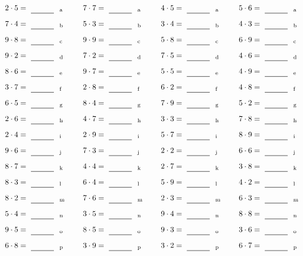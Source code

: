 \documentclass
[
  draft    = true,
  fontsize = 11pt,
  parskip  = half-
]
{scrartcl}
\begin{document}
\par\vfill\par
\begin{align*}
    \pline{2\cdot5}&=\rline{a}
  & \pline{7\cdot7}&=\rline{a}
  & \pline{4\cdot5}&=\rline{a}
  & \pline{5\cdot6}&=\rline{a} \\[1ex]
    \pline{7\cdot4}&=\rline{b}
  & \pline{5\cdot3}&=\rline{b}
  & \pline{3\cdot4}&=\rline{b}
  & \pline{4\cdot3}&=\rline{b} \\[1ex]
    \pline{9\cdot8}&=\rline{c}
  & \pline{9\cdot9}&=\rline{c}
  & \pline{5\cdot8}&=\rline{c}
  & \pline{6\cdot9}&=\rline{c} \\[1ex]
    \pline{9\cdot2}&=\rline{d}
  & \pline{7\cdot2}&=\rline{d}
  & \pline{7\cdot5}&=\rline{d}
  & \pline{4\cdot6}&=\rline{d} \\[1ex]
    \pline{8\cdot6}&=\rline{e}
  & \pline{9\cdot7}&=\rline{e}
  & \pline{5\cdot5}&=\rline{e}
  & \pline{4\cdot9}&=\rline{e} \\[1ex]
    \pline{3\cdot7}&=\rline{f}
  & \pline{2\cdot8}&=\rline{f}
  & \pline{6\cdot2}&=\rline{f}
  & \pline{4\cdot8}&=\rline{f} \\[1ex]
    \pline{6\cdot5}&=\rline{g}
  & \pline{8\cdot4}&=\rline{g}
  & \pline{7\cdot9}&=\rline{g}
  & \pline{5\cdot2}&=\rline{g} \\[1ex]
    \pline{2\cdot6}&=\rline{h}
  & \pline{4\cdot7}&=\rline{h}
  & \pline{3\cdot3}&=\rline{h}
  & \pline{7\cdot8}&=\rline{h} \\[1ex]
    \pline{2\cdot4}&=\rline{i}
  & \pline{2\cdot9}&=\rline{i}
  & \pline{5\cdot7}&=\rline{i}
  & \pline{8\cdot9}&=\rline{i} \\[1ex]
    \pline{9\cdot6}&=\rline{j}
  & \pline{7\cdot3}&=\rline{j}
  & \pline{2\cdot2}&=\rline{j}
  & \pline{6\cdot6}&=\rline{j} \\[1ex]
    \pline{8\cdot7}&=\rline{k}
  & \pline{4\cdot4}&=\rline{k}
  & \pline{2\cdot7}&=\rline{k}
  & \pline{3\cdot8}&=\rline{k} \\[1ex]
    \pline{8\cdot3}&=\rline{l}
  & \pline{6\cdot4}&=\rline{l}
  & \pline{5\cdot9}&=\rline{l}
  & \pline{4\cdot2}&=\rline{l} \\[1ex]
    \pline{8\cdot2}&=\rline{m}
  & \pline{7\cdot6}&=\rline{m}
  & \pline{2\cdot3}&=\rline{m}
  & \pline{6\cdot3}&=\rline{m} \\[1ex]
    \pline{5\cdot4}&=\rline{n}
  & \pline{3\cdot5}&=\rline{n}
  & \pline{9\cdot4}&=\rline{n}
  & \pline{8\cdot8}&=\rline{n} \\[1ex]
    \pline{9\cdot5}&=\rline{o}
  & \pline{8\cdot5}&=\rline{o}
  & \pline{9\cdot3}&=\rline{o}
  & \pline{3\cdot6}&=\rline{o} \\[1ex]
    \pline{6\cdot8}&=\rline{p}
  & \pline{3\cdot9}&=\rline{p}
  & \pline{3\cdot2}&=\rline{p}
  & \pline{6\cdot7}&=\rline{p}
\end{align*}
\end{document}
